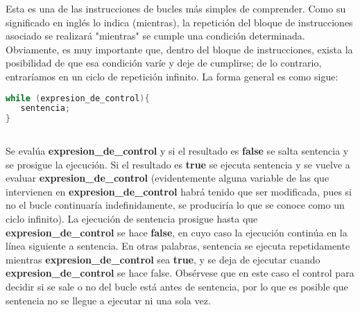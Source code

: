 Esta es una de las instrucciones de bucles más simples de comprender. Como su
significado en inglés lo indica (mientras), la repetición del bloque de instrucciones asociado se realizará "mientras" se cumple una condición determinada. Obviamente, es muy importante que, dentro del bloque de instrucciones, exista la posibilidad de que
esa condición varíe y deje de cumplirse; de lo contrario, entraríamos en un ciclo de repetición infinito. La forma general es como sigue:

\begin{lstlisting}[language=C++]
while (expresion_de_control){
   sentencia;
}
	
\end{lstlisting}

Se evalúa \textbf{expresion\_de\_control} y si el resultado es \textbf{false} se salta sentencia y
se prosigue la ejecución. Si el resultado es \textbf{true} se ejecuta sentencia y se vuelve a evaluar
\textbf{expresion\_de\_control} (evidentemente alguna variable de las que intervienen en
\textbf{expresion\_de\_control} habrá tenido que ser modificada, pues si no el bucle continuaría
indefinidamente, se produciría lo que se conoce como un ciclo infinito). La ejecución de sentencia prosigue hasta que \textbf{expresion\_de\_control} se
hace \textbf{false}, en cuyo caso la ejecución continúa en la línea siguiente a sentencia. En otras
palabras, sentencia se ejecuta repetidamente mientras \textbf{expresion\_de\_control} sea \textbf{true}, y se
deja de ejecutar cuando \textbf{expresion\_de\_control} se hace false. Obsérvese que en este caso el
control para decidir si se sale o no del bucle está antes de sentencia, por lo que es posible que
sentencia no se llegue a ejecutar ni una sola vez.